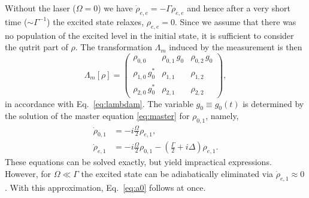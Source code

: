 \documentclass[
aps,prl,
reprint,
a4paper,
superscriptaddress,
floatfix,
]{revtex4-1}
\begin{document}
Without the laser ($\Omega= 0$) we have $\dot \rho_{e,e}= -\Gamma \rho_{e,e}$ 
 and hence after a very short time ($\sim \Gamma^{-1}$) the excited state relaxes, 
 $\rho_{e,e}= 0$.
Since we assume that there was no population of the excited level in the 
 initial state, it is sufficient to consider the qutrit part of $\rho$.
The transformation $\Lambda_m$ induced by the measurement is then
%
\begin{equation}
 \Lambda_m[\rho]=
 \begin{pmatrix}
  \rho_{0,0}& \rho_{0,1}\,g_0&\rho_{0,2}\,g_0 \\
  \rho_{1,0}\,g_0^*& \rho_{1,1}&\rho_{1,2} \\
  \rho_{2,0}\,g_0^*& \rho_{2,1}&\rho_{2,2}
 \end{pmatrix},
\end{equation}
%
 in accordance with Eq.~\eqref{eq:lambdam}.
The variable $g_0\equiv g_0(t)$ is determined by the solution of the master 
 equation \eqref{eq:master} for $\rho_{0,1}$, namely,
%
\begin{align}
 \dot\rho_{0,1}&= -i\frac\Omega2 \rho_{e,1}, \\
 \dot\rho_{e,1}&= -i\frac\Omega2 \rho_{0,1}-
                 \left(\frac\Gamma2+i\Delta\right)\rho_{e,1}.
\end{align}
%
These equations can be solved exactly, but yield impractical expressions.
However, for $\Omega\ll \Gamma$ the excited state can be adiabatically 
 eliminated via $\dot{\rho}_{e,1}\approx 0$.
With this approximation, Eq.~\eqref{eq:a0} follows at once.
\end{document}
